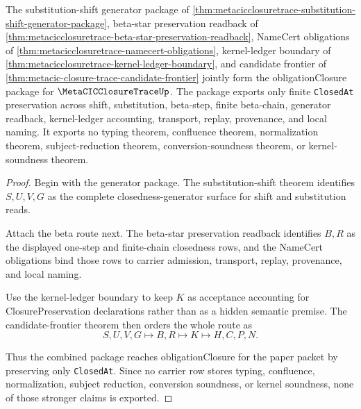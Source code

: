 \begin{theorem}
\label{thm:metacicclosuretrace-obligation-closure-upgrade}
The substitution-shift generator package of \autoref{thm:metacicclosuretrace-substitution-shift-generator-package}, beta-star preservation readback of \autoref{thm:metacicclosuretrace-beta-star-preservation-readback}, NameCert obligations of \autoref{thm:metacicclosuretrace-namecert-obligations}, kernel-ledger boundary of \autoref{thm:metacicclosuretrace-kernel-ledger-boundary}, and candidate frontier of \autoref{thm:metacic-closure-trace-candidate-frontier} jointly form the obligationClosure package for $\MetaCICClosureTraceUp$. The package exports only finite \texttt{ClosedAt} preservation across shift, substitution, beta-step, finite beta-chain, generator readback, kernel-ledger accounting, transport, replay, provenance, and local naming. It exports no typing theorem, confluence theorem, normalization theorem, subject-reduction theorem, conversion-soundness theorem, or kernel-soundness theorem.
\end{theorem}
\begin{proof}
Begin with the generator package. The substitution-shift theorem identifies $S,U,V,G$ as the complete closedness-generator surface for shift and substitution reads.

Attach the beta route next. The beta-star preservation readback identifies $B,R$ as the displayed one-step and finite-chain closedness rows, and the NameCert obligations bind those rows to carrier admission, transport, replay, provenance, and local naming.

Use the kernel-ledger boundary to keep $K$ as acceptance accounting for ClosurePreservation declarations rather than as a hidden semantic premise. The candidate-frontier theorem then orders the whole route as
$$
S,U,V,G \longmapsto B,R \longmapsto K \longmapsto H,C,P,N .
$$

Thus the combined package reaches obligationClosure for the paper packet by preserving only \texttt{ClosedAt}. Since no carrier row stores typing, confluence, normalization, subject reduction, conversion soundness, or kernel soundness, none of those stronger claims is exported.
\end{proof}

